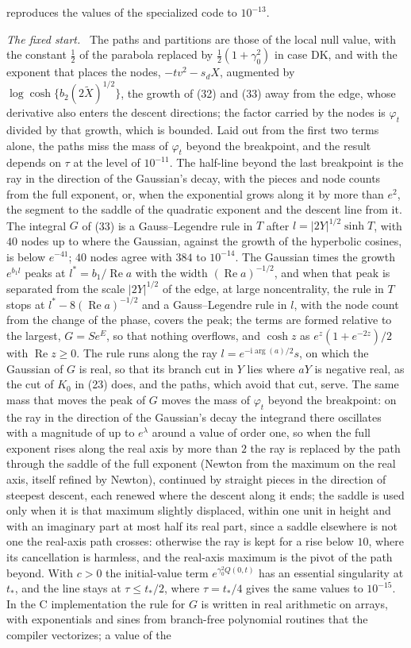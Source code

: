 \documentclass[ecta,nameyear,final,supplement]{econsocart}
\newcommand{\iu}{{\mathrm i}}
\newcommand{\Rea}{\operatorname{Re}}
\newcommand{\Fk}{\textsf{\upshape DK}}
\theoremstyle{plain}
\theoremstyle{definition}
\newcommand{\runin}[1]{\par\medskip\noindent\textit{#1.}\ \ignorespaces}
\begin{document}
reproduces the values of the specialized code to $10^{-13}$.

\runin{The fixed start}  The paths and partitions are those of the local null value, with the constant $\frac12$ of the parabola replaced by $\frac12(1+\gamma_0^2)$ in case \Fk, and with the exponent that places the nodes, $-tv^2-s_dX$, augmented by $\log\cosh\{b_2(2\tilde X)^{1/2}\}$, the growth of (32) and (33) away from the edge, whose derivative also enters the descent directions; the factor carried by the nodes is $\varphi_t$ divided by that growth, which is bounded.  Laid out from the first two terms alone, the paths miss the mass of $\varphi_t$ beyond the breakpoint, and the result depends on $\tau$ at the level of $10^{-11}$.  The half-line beyond the last breakpoint is the ray in the direction of the Gaussian's decay, with the pieces and node counts from the full exponent, or, when the exponential grows along it by more than $e^2$, the segment to the saddle of the quadratic exponent and the descent line from it.  The integral $G$ of (33) is a Gauss--Legendre rule in $T$ after $l=|2Y|^{1/2}\sinh T$, with $40$ nodes up to where the Gaussian, against the growth of the hyperbolic cosines, is below $e^{-41}$; $40$ nodes agree with $384$ to $10^{-14}$.  The Gaussian times the growth $e^{b_1l}$ peaks at $l^*=b_1/\Rea a$ with the width $(\Rea a)^{-1/2}$, and when that peak is separated from the scale $|2Y|^{1/2}$ of the edge, at large noncentrality, the rule in $T$ stops at $l^*-8(\Rea a)^{-1/2}$ and a Gauss--Legendre rule in $l$, with the node count from the change of the phase, covers the peak; the terms are formed relative to the largest, $G=Se^{E}$, so that nothing overflows, and $\cosh z$ as $e^z(1+e^{-2z})/2$ with $\Rea z\ge0$.  The rule runs along the ray $l=e^{-\iu\arg(a)/2}s$, on which the Gaussian of $G$ is real, so that its branch cut in $Y$ lies where $aY$ is negative real, as the cut of $K_0$ in (23) does, and the paths, which avoid that cut, serve.  The same mass that moves the peak of $G$ moves the mass of $\varphi_t$ beyond the breakpoint: on the ray in the direction of the Gaussian's decay the integrand there oscillates with a magnitude of up to $e^{\lambda}$ around a value of order one, so when the full exponent rises along the real axis by more than $2$ the ray is replaced by the path through the saddle of the full exponent (Newton from the maximum on the real axis, itself refined by Newton), continued by straight pieces in the direction of steepest descent, each renewed where the descent along it ends; the saddle is used only when it is that maximum slightly displaced, within one unit in height and with an imaginary part at most half its real part, since a saddle elsewhere is not one the real-axis path crosses: otherwise the ray is kept for a rise below $10$, where its cancellation is harmless, and the real-axis maximum is the pivot of the path beyond.  With $c>0$ the initial-value term $e^{\gamma_0^2Q(0,t)}$ has an essential singularity at $t_*$, and the line stays at $\tau\le t_*/2$, where $\tau=t_*/4$ gives the same values to $10^{-15}$.  In the C implementation the rule for $G$ is written in real arithmetic on arrays, with exponentials and sines from branch-free polynomial routines that the compiler vectorizes; a value of the 
\end{document}
